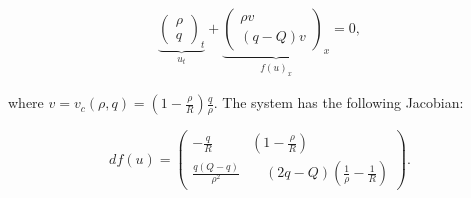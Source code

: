 \documentclass[10pt]{article}
\numberwithin{equation}{section}
\begin{document}
\begin{align*}
    \underbrace{\begin{pmatrix} \rho \\ q \end{pmatrix}_t}_{u_t} +  \underbrace{\begin{pmatrix} \rho v  \\ (q - Q) v \end{pmatrix}_x}_{f(u)_x} = 0, 
\end{align*}

where $v = v_c(\rho,  q) = (1 - \frac{\rho}{R}) \frac{q}{\rho}$. The system has the following Jacobian:

\begin{equation*}
    df(u) =\begin{pmatrix} -\frac{q}{R} & (1- \frac{\rho}{R}) \\ 
                            \frac{q(Q-q)}{\rho ^2} & \quad (2q -Q)(\frac{1}{\rho} - \frac{1}{R}) \end{pmatrix}.
\end{equation*}
\end{document}
